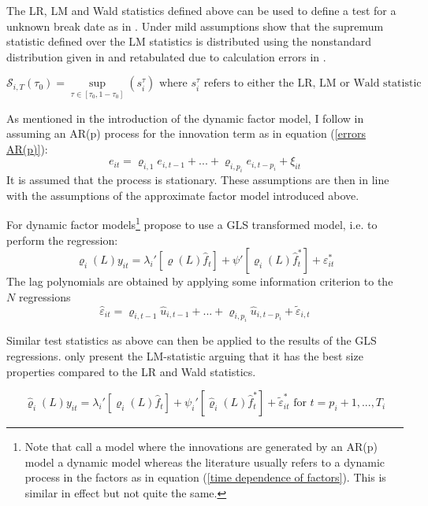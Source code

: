 \documentclass[12pt]{article}
\begin{document}
The LR, LM and Wald statistics defined above can be used to define a test for a unknown break date as in \citet{andrews1993tests}. Under mild assumptions \citet{breitung2011testing} show that the supremum statistic defined over the LM statistics is distributed using the nonstandard distribution given in \citet{andrews1993tests} and retabulated due to calculation errors in \citet{andrews2003tests}.

\begin{equation}
\label{sup LM statistic}
\mathscr{S}_{i,T}(\tau_0) = \sup_{\tau \in [\tau_0, 1-\tau_0]} (s_i^\tau) \text{ where $s_i^\tau$ refers to either the LR, LM or Wald statistic}
\end{equation}



As mentioned in the introduction of the dynamic factor model, I follow \citet{breitung2011testing} in assuming an AR(p) process for the innovation term as in equation (\ref{errors AR(p)}):
\begin{equation}
	\label{errors AR(p)}
	e_{it} = \varrho_{i, 1} e_{i, t-1} + ... + \varrho_{i, p_i} e_{i, t-p_i} + \xi_{it}
\end{equation}
It is assumed that the process is stationary. These assumptions are then in line with the assumptions of the approximate factor model introduced above.

For dynamic factor models\footnote{Note that \citet{breitung2011testing} call a model where the innovations are generated by an AR(p) model a dynamic model whereas the literature usually refers to a dynamic process in the factors as in equation (\ref{time dependence of factors}). This is similar in effect but not quite the same.} \citet{breitung2011testing} propose to use a GLS transformed model, i.e. to perform the regression:
$$\varrho_i(L) y_{it} = \lambda_i'[\varrho(L) \hat f_t] + \psi' [\varrho_i(L) \hat f_t^*] + \varepsilon^*_{it}$$
The lag polynomials are obtained by applying some information criterion to the $N$ regressions
$$\hat \varepsilon_{it} = \varrho_{i, t-1} \hat u_{i, t-1} + ... + \varrho_{i, p_i} \hat u_{i, t-p_i} + \tilde \varepsilon_{i,t}$$

Similar test statistics as above can then be applied to the results of the GLS regressions. \citet{breitung2011testing} only present the LM-statistic arguing that it has the best size properties compared to the LR and Wald statistics.

$$\hat \varrho_i(L) y_{it} = \lambda_i' \left[\varrho_i(L) \hat f_t\right] + \psi_i' \left[\hat \varrho_i(L) \hat f_t^*\right] + \tilde \varepsilon^*_{it} \text{ for } t= p_i+1, ..., T_i$$
\end{document}
